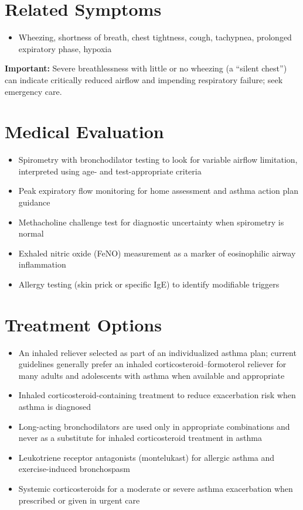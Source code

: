 \section*{Related Symptoms}
\begin{itemize}
 \item Wheezing, shortness of breath, chest tightness, cough, tachypnea, prolonged expiratory phase, hypoxia
\end{itemize}
\textbf{Important:} Severe breathlessness with little or no wheezing (a ``silent chest'') can indicate critically reduced airflow and impending respiratory failure; seek emergency care.

\section*{Medical Evaluation}
\begin{itemize}
 \item Spirometry with bronchodilator testing to look for variable airflow limitation, interpreted using age- and test-appropriate criteria
 \item Peak expiratory flow monitoring for home assessment and asthma action plan guidance
 \item Methacholine challenge test for diagnostic uncertainty when spirometry is normal
 \item Exhaled nitric oxide (FeNO) measurement as a marker of eosinophilic airway inflammation
 \item Allergy testing (skin prick or specific IgE) to identify modifiable triggers
\end{itemize}

\section*{Treatment Options}
\begin{itemize}
 \item An inhaled reliever selected as part of an individualized asthma plan; current guidelines generally prefer an inhaled corticosteroid--formoterol reliever for many adults and adolescents with asthma when available and appropriate
 \item Inhaled corticosteroid-containing treatment to reduce exacerbation risk when asthma is diagnosed
 \item Long-acting bronchodilators are used only in appropriate combinations and never as a substitute for inhaled corticosteroid treatment in asthma
 \item Leukotriene receptor antagonists (montelukast) for allergic asthma and exercise-induced bronchospasm
 \item Systemic corticosteroids for a moderate or severe asthma exacerbation when prescribed or given in urgent care
\end{itemize}

